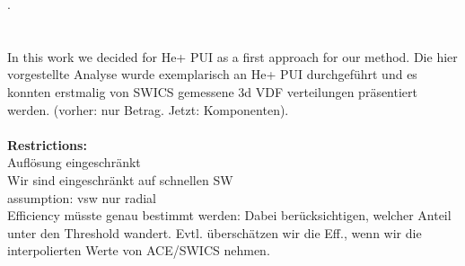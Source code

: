 .
\\ \\ \\
In this work we decided for He+ PUI as a first approach for our method. 
Die hier vorgestellte Analyse wurde exemplarisch an He+ PUI durchgeführt und es konnten erstmalig von SWICS gemessene 3d VDF verteilungen präsentiert werden. 
\newpage
(vorher: nur Betrag. Jetzt: Komponenten).\\ \\
\textbf{Restrictions:}\\
Auflösung eingeschränkt\\
Wir sind eingeschränkt auf schnellen SW\\
assumption: vsw nur radial\\
Efficiency müsste genau bestimmt werden: Dabei berücksichtigen, welcher Anteil unter den Threshold wandert. Evtl. überschätzen wir die Eff., wenn wir die interpolierten Werte von ACE/SWICS nehmen.



